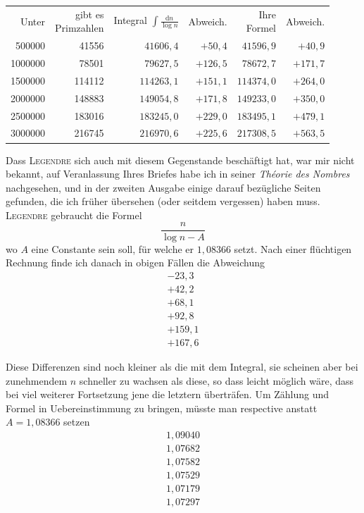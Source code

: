 \begin{center}
\begingroup\fontsize{10}{11.5}\selectfont\setlength{\tabcolsep}{3pt}
\begin{tabular}{r|r|rr|rr}
Unter & \shortstack{gibt es\\Primzahlen} & \shortstack{Integral\\$\displaystyle\int\frac{\mathrm{d}n}{\log n}$} & Abweich. & \shortstack{Ihre\\Formel} & Abweich. \\
500000 & 41556 & $41606{,}4$ & $+50{,}4$ & $41596{,}9$ & $+40{,}9$ \\
1000000 & 78501 & $79627{,}5$ & $+126{,}5$ & $78672{,}7$ & $+171{,}7$ \\
1500000 & 114112 & $114263{,}1$ & $+151{,}1$ & $114374{,}0$ & $+264{,}0$ \\
2000000 & 148883 & $149054{,}8$ & $+171{,}8$ & $149233{,}0$ & $+350{,}0$ \\
2500000 & 183016 & $183245{,}0$ & $+229{,}0$ & $183495{,}1$ & $+479{,}1$ \\
3000000 & 216745 & $216970{,}6$ & $+225{,}6$ & $217308{,}5$ & $+563{,}5$
\end{tabular}\endgroup
\end{center}

Dass \textsc{Legendre} sich auch mit diesem Gegenstande beschäftigt hat, war mir nicht bekannt, auf Veranlassung Ihres Briefes habe ich in seiner \textit{Théorie des Nombres} nachgesehen, und in der zweiten Ausgabe einige darauf bezügliche Seiten gefunden, die ich früher übersehen (oder seitdem vergessen) haben muss. \textsc{Legendre} gebraucht die Formel
\[
\frac{n}{\log n-A}
\]
wo $A$ eine Constante sein soll, für welche er $1{,}08366$ setzt. Nach einer flüchtigen Rechnung finde ich danach in obigen Fällen die Abweichung
\[
\begin{array}{r}
-23{,}3\\
+42{,}2\\
+68{,}1\\
+92{,}8\\
+159{,}1\\
+167{,}6
\end{array}
\]

Diese Differenzen sind noch kleiner als die mit dem Integral, sie scheinen aber bei zunehmendem $n$ schneller zu wachsen als diese, so dass leicht möglich
%
wäre, dass bei viel weiterer Fortsetzung jene die letztern überträfen. Um Zählung und Formel in Uebereinstimmung zu bringen, müsste man respective anstatt $A=1{,}08366$ setzen
\[
\begin{array}{r}
1{,}09040\\
1{,}07682\\
1{,}07582\\
1{,}07529\\
1{,}07179\\
1{,}07297
\end{array}
\]

